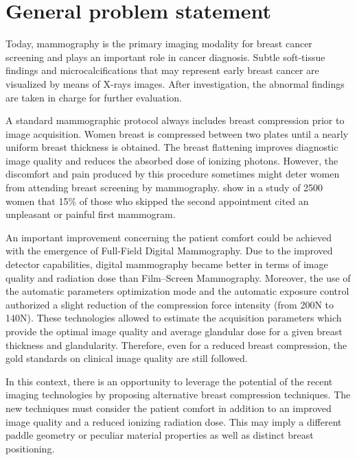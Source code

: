 \chapter*{General problem statement}
\label{section:generalproblemstatment}

Today, mammography is the primary imaging modality for breast cancer screening and plays an important role in cancer diagnosis. Subtle soft-tissue findings and microcalcifications that may represent early breast cancer are visualized by means of X-rays images. After investigation, the abnormal findings are taken in charge for further evaluation.  

A standard mammographic protocol always includes breast compression prior to image acquisition. Women breast is compressed between two plates until a nearly uniform breast thickness is obtained. The breast flattening improves diagnostic image quality and reduces the absorbed dose of ionizing photons. However, the discomfort and pain produced by this procedure sometimes might deter women from attending breast screening by mammography. \cite{fleming_intermittent_2013} show in a study of 2500 women that 15\% of those who skipped the second appointment cited an unpleasant or painful first mammogram.  

An important improvement concerning the patient comfort could be achieved with the emergence of Full-Field Digital Mammography. Due to the improved detector capabilities, digital mammography became better in terms of image quality and radiation dose than Film–Screen Mammography. Moreover, the use of the automatic parameters optimization mode and the automatic exposure control authorized a slight reduction of the compression force intensity (from 200N to 140N). These technologies allowed to estimate the acquisition parameters which provide the optimal image quality and average glandular dose for a given breast thickness and glandularity. Therefore, even for a reduced breast compression, the gold standards on clinical image quality are still followed.

In this context, there is an opportunity to leverage the potential of the recent imaging technologies by proposing alternative breast compression techniques. The new techniques must consider the patient comfort in addition to an improved image quality and a reduced ionizing radiation dose. This may imply a different paddle geometry or peculiar material properties as well as distinct breast positioning.

